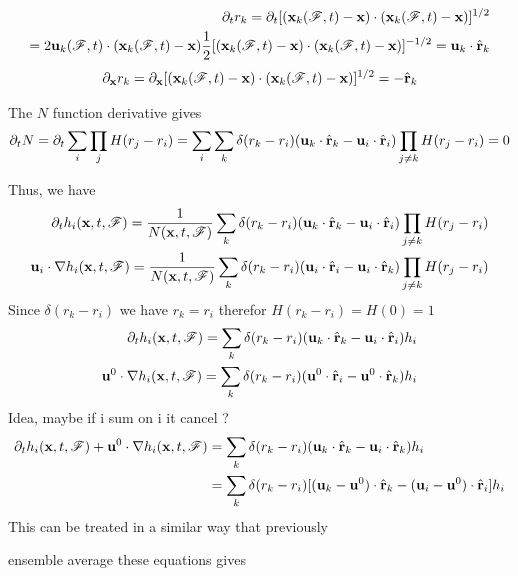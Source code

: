 \documentclass[11pt]{My_preprint}
\begin{document}
\begin{align*}
    \partial_t r_k
    = \partial_t [(\textbf{x}_k(\mathscr{F},t) - \textbf{x})\cdot (\textbf{x}_k(\mathscr{F},t) - \textbf{x})]^{1/2}\\
    = 
    2 \textbf{u}_k(\mathscr{F},t)  \cdot (\textbf{x}_k(\mathscr{F},t) - \textbf{x})
    \frac{1}{2}[(\textbf{x}_k(\mathscr{F},t) - \textbf{x})\cdot (\textbf{x}_k(\mathscr{F},t) - \textbf{x})]^{- 1/2}
    = 
    \textbf{u}_k  \cdot \hat{\textbf{r}}_k
\end{align*}
\begin{align*}
    {\partial_\textbf{x}} r_k
    = {\partial_\textbf{x}} [(\textbf{x}_k(\mathscr{F},t) - \textbf{x})\cdot (\textbf{x}_k(\mathscr{F},t) - \textbf{x})]^{1/2}
    = - \hat{\textbf{r}}_k
\end{align*}

The $N$ function derivative gives 
\begin{equation*}
    \partial_t 
    N 
    = \partial_t 
    \sum_i \prod_j
    H(r_j - r_i)
    = 
    \sum_i 
    \sum_k 
    \delta(r_k - r_i)
    (\textbf{u}_k  \cdot \hat{\textbf{r}}_k - \textbf{u}_i  \cdot \hat{\textbf{r}}_i)
    \prod_{j\neq k}
    H(r_j - r_i) = 0 
\end{equation*}

Thus, we have \citet{zhang2021ensemble} 
\begin{align*}
    \partial_t  h_i(\textbf{x},t,\mathscr{F})
    = 
    \frac{1}{N(\textbf{x},t,\mathscr{F})}
    \sum_k 
    \delta(r_k - r_i)
    (\textbf{u}_k  \cdot \hat{\textbf{r}}_k - \textbf{u}_i  \cdot \hat{\textbf{r}}_i)
    \prod_{j\neq k}
    H(r_j - r_i)
    \\
    \textbf{u}_i \cdot \mathbf{\nabla} h_i(\textbf{x},t,\mathscr{F})
    = 
    \frac{1}{N(\textbf{x},t,\mathscr{F})}
    \sum_k 
    \delta(r_k - r_i)
    (\textbf{u}_i  \cdot \hat{\textbf{r}}_i -  \textbf{u}_i  \cdot\hat{\textbf{r}}_k)
    \prod_{j\neq k}
    H(r_j - r_i)
    \\
\end{align*}
Since $\delta(r_k - r_i)$ we have $r_k = r_i$ therefor $H(r_k - r_i) = H(0) = 1 $
\begin{align*}
    \partial_t  h_i(\textbf{x},t,\mathscr{F})
    = 
    \sum_k 
    \delta(r_k - r_i)
    (\textbf{u}_k  \cdot \hat{\textbf{r}}_k - \textbf{u}_i  \cdot \hat{\textbf{r}}_i)
    h_i
    \\
    \textbf{u}^0 \cdot \mathbf{\nabla} h_i(\textbf{x},t,\mathscr{F})
    = 
    \sum_k 
    \delta(r_k - r_i)
    (\textbf{u}^0  \cdot \hat{\textbf{r}}_i -  \textbf{u}^0  \cdot\hat{\textbf{r}}_k)
    h_i
    \\
\end{align*}
Idea, maybe if i sum on i it cancel ? 
\begin{align*}
    \partial_t  h_i(\textbf{x},t,\mathscr{F}) +\textbf{u}^0 \cdot \mathbf{\nabla} h_i(\textbf{x},t,\mathscr{F})
    &= 
    \sum_k 
    \delta(r_k - r_i)
    (\textbf{u}_k  \cdot \hat{\textbf{r}}_k  - \textbf{u}_i  \cdot \hat{\textbf{r}}_k)
    h_i
    \\
    &= 
    \sum_k 
    \delta(r_k - r_i)
    [(\textbf{u}_k  - \textbf{u}^0) \cdot \hat{\textbf{r}}_k - (\textbf{u}_i - \textbf{u}^0)  \cdot \hat{\textbf{r}}_i]
    h_i
    \\
\end{align*}
This can be treated in a similar way that previously

ensemble average these equations gives 
\end{document}
